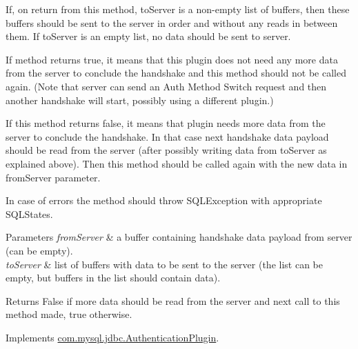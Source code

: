 If, on return from this method, to\+Server is a non-\/empty list of buffers, then these buffers should be sent to the server in order and without any reads in between them. If to\+Server is an empty list, no data should be sent to server.

If method returns true, it means that this plugin does not need any more data from the server to conclude the handshake and this method should not be called again. (Note that server can send an Auth Method Switch request and then another handshake will start, possibly using a different plugin.)

If this method returns false, it means that plugin needs more data from the server to conclude the handshake. In that case next handshake data payload should be read from the server (after possibly writing data from to\+Server as explained above). Then this method should be called again with the new data in from\+Server parameter.

In case of errors the method should throw S\+Q\+L\+Exception with appropriate S\+Q\+L\+States.


\begin{DoxyParams}{Parameters}
{\em from\+Server} & a buffer containing handshake data payload from server (can be empty). \\
\hline
{\em to\+Server} & list of buffers with data to be sent to the server (the list can be empty, but buffers in the list should contain data).\\
\hline
\end{DoxyParams}
\begin{DoxyReturn}{Returns}
False if more data should be read from the server and next call to this method made, true otherwise. 
\end{DoxyReturn}


Implements \mbox{\hyperlink{interfacecom_1_1mysql_1_1jdbc_1_1_authentication_plugin_a1ed9558616b029386dc24bcade409f3d}{com.\+mysql.\+jdbc.\+Authentication\+Plugin}}.

